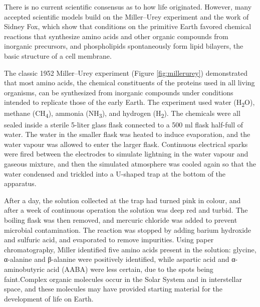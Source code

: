 There is no current scientific consensus as to how life originated. However, many accepted scientific models build on the Miller--Urey experiment and the work of Sidney Fox, which show that conditions on the primitive Earth favored chemical reactions that synthesize amino acids and other organic compounds from inorganic precursors, and phospholipids spontaneously form lipid bilayers, the basic structure of a cell membrane.

The classic 1952 Miller--Urey experiment (Figure \ref{fig:millerurey}) demonstrated that most amino acids, the chemical constituents of the proteins used in all living organisms, can be synthesized from inorganic compounds under conditions intended to replicate those of the early Earth. The experiment used water (H\textsubscript{2}O), methane (CH\textsubscript{4}), ammonia (NH\textsubscript{3}), and hydrogen (H\textsubscript{2}). The chemicals were all sealed inside a sterile 5-liter glass flask connected to a 500 ml flask half-full of water. The water in the smaller flask was heated to induce evaporation, and the water vapour was allowed to enter the larger flask. Continuous electrical sparks were fired between the electrodes to simulate lightning in the water vapour and gaseous mixture, and then the simulated atmosphere was cooled again so that the water condensed and trickled into a U-shaped trap at the bottom of the apparatus.

After a day, the solution collected at the trap had turned pink in colour, and after a week of continuous operation the solution was deep red and turbid. The boiling flask was then removed, and mercuric chloride was added to prevent microbial contamination. The reaction was stopped by adding barium hydroxide and sulfuric acid, and evaporated to remove impurities. Using paper chromatography, Miller identified five amino acids present in the solution: glycine, α-alanine and β-alanine were positively identified, while aspartic acid and α-aminobutyric acid (AABA) were less certain, due to the spots being faint.Complex organic molecules occur in the Solar System and in interstellar space, and these molecules may have provided starting material for the development of life on Earth.




